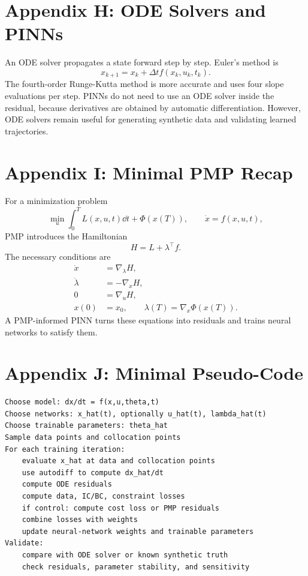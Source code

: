 \documentclass[11pt,a4paper]{article}
\begin{document}
\section{Appendix H: ODE Solvers and PINNs}
An ODE solver propagates a state forward step by step. Euler's method is
\begin{equation}
    x_{k+1}=x_k+\Delta t f(x_k,u_k,t_k).
\end{equation}
The fourth-order Runge-Kutta method is more accurate and uses four slope evaluations per step. PINNs do not need to use an ODE solver inside the residual, because derivatives are obtained by automatic differentiation. However, ODE solvers remain useful for generating synthetic data and validating learned trajectories.

\section{Appendix I: Minimal PMP Recap}
For a minimization problem
\begin{equation}
    \min_u \int_0^T L(x,u,t)\dd t+\Phi(x(T)),\qquad \dot{x}=f(x,u,t),
\end{equation}
PMP introduces the Hamiltonian
\begin{equation}
    H=L+\lambda^\top f.
\end{equation}
The necessary conditions are
\begin{align}
    \dot{x}&=\nabla_\lambda H,\\
    \dot{\lambda}&=-\nabla_x H,\\
    0&=\nabla_u H,\\
    x(0)&=x_0,\qquad \lambda(T)=\nabla_x\Phi(x(T)).
\end{align}
A PMP-informed PINN turns these equations into residuals and trains neural networks to satisfy them.

\section{Appendix J: Minimal Pseudo-Code}
\begin{lstlisting}
Choose model: dx/dt = f(x,u,theta,t)
Choose networks: x_hat(t), optionally u_hat(t), lambda_hat(t)
Choose trainable parameters: theta_hat
Sample data points and collocation points
For each training iteration:
    evaluate x_hat at data and collocation points
    use autodiff to compute dx_hat/dt
    compute ODE residuals
    compute data, IC/BC, constraint losses
    if control: compute cost loss or PMP residuals
    combine losses with weights
    update neural-network weights and trainable parameters
Validate:
    compare with ODE solver or known synthetic truth
    check residuals, parameter stability, and sensitivity
\end{lstlisting}
\end{document}
